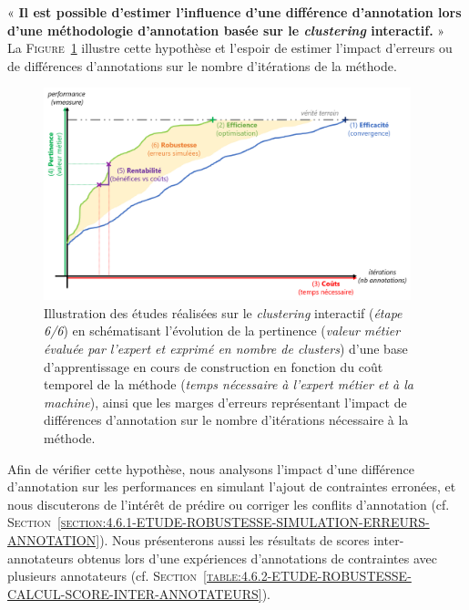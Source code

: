 	\begin{tcolorbox}[
		title=\faVial~\textbf{Hypothèse de robustesse}~\faVial,
		colback=colorTcolorboxHypothesis!15,
		colframe=colorTcolorboxHypothesis!75,
		width=\linewidth
	]
		« \textbf{
			Il est possible d'\textbf{estimer l'influence d'une différence d'annotation} lors d'une méthodologie d'annotation basée sur le \textit{clustering} interactif.
		} » \\
		
		La \textsc{Figure~\ref{figure:4.6-HYPOTHESE-ROBUSTESSE}} illustre cette hypothèse et l'espoir de estimer l'impact d'erreurs ou de différences d'annotations sur le nombre d'itérations de la méthode.
		\begin{figure}[H]  %
			\centering
			\includegraphics[width=0.95\textwidth]{figures/hypotheses-06-robustesse}
			\caption{Illustration des études réalisées sur le \textit{clustering} interactif (\textit{étape 6/6}) en schématisant l'évolution de la pertinence (\textit{valeur métier évaluée par l'expert et exprimé en nombre de clusters}) d'une base d'apprentissage en cours de construction en fonction du coût temporel de la méthode (\textit{temps nécessaire à l'expert métier et à la machine}), ainsi que les marges d'erreurs représentant l'impact de différences d'annotation sur le nombre d'itérations nécessaire à la méthode.}
			\label{figure:4.6-HYPOTHESE-ROBUSTESSE}
		\end{figure}

	\end{tcolorbox}
		
	Afin de vérifier cette hypothèse, nous analysons l'impact d'une différence d'annotation sur les performances en simulant l'ajout de contraintes erronées, et nous discuterons de l'intérêt de prédire ou corriger les conflits d'annotation (cf. \textsc{Section~\ref{section:4.6.1-ETUDE-ROBUSTESSE-SIMULATION-ERREURS-ANNOTATION}}).
	Nous présenterons aussi les résultats de scores inter-annotateurs obtenus lors d'une expériences d'annotations de contraintes avec plusieurs annotateurs (cf. \textsc{Section~\ref{table:4.6.2-ETUDE-ROBUSTESSE-CALCUL-SCORE-INTER-ANNOTATEURS}}).
	
